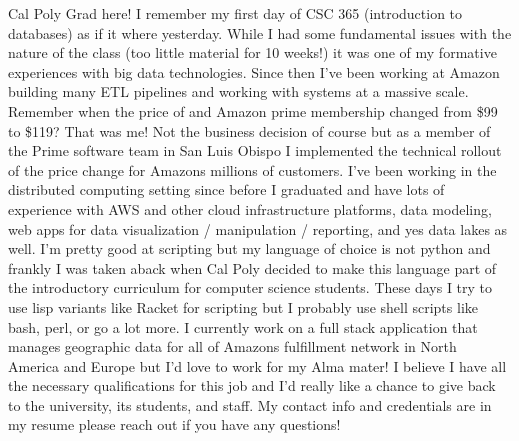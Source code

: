\documentclass[12pt,stdletter,orderfromtodate,sigleft]{newlfm}
\begin{document}
\begin{newlfm}
Cal Poly Grad here! I remember my first day of CSC 365 (introduction to databases) as if it where yesterday. While I had some fundamental issues with the nature of the class (too little material for 10 weeks!) it was one of my formative experiences with big data technologies. Since then I've been working at Amazon building many ETL pipelines and working with systems at a massive scale. Remember when the price of and Amazon prime membership changed from \$99 to \$119? That was me! Not the business decision of course but as a member of the Prime software team in San Luis Obispo I implemented the technical rollout of the price change for Amazons millions of customers. I've been working in the distributed computing setting since before I graduated and have lots of experience with AWS and other cloud infrastructure platforms, data modeling, web apps for data visualization / manipulation / reporting, and yes data lakes as well. I'm pretty good at scripting but my language of choice is not python and frankly I was taken aback when Cal Poly decided to make this language part of the introductory curriculum for computer science students. These days I try to use lisp variants like Racket for scripting but I probably use shell scripts like bash, perl, or go a lot more. I currently work on a full stack application that manages geographic data for all of Amazons fulfillment network in North America and Europe but I'd love to work for my Alma mater! I believe I have all the necessary qualifications for this job and I'd really like a chance to give back to the university, its students, and staff. My contact info and credentials are in my resume please reach out if you have any questions!
\end{newlfm}
\end{document}
